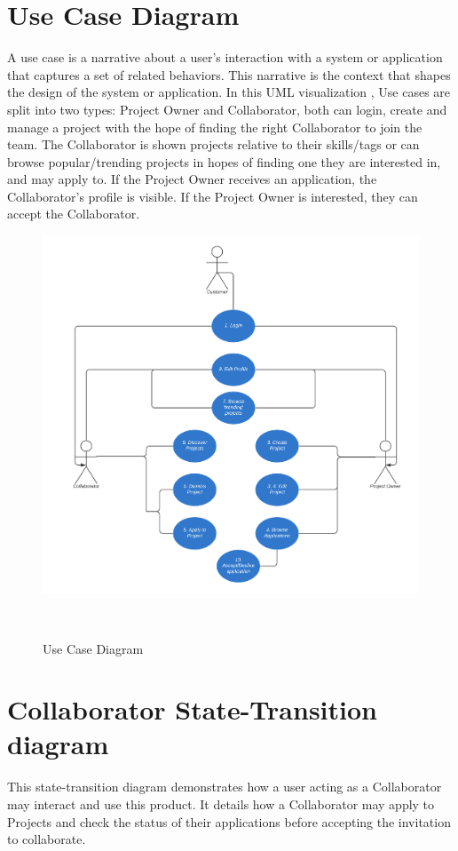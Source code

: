 \documentclass[a4paper,11pt]{report}
\begin{document}
\section{Use Case Diagram}
A use case is a narrative about a user's interaction with a system or
application that captures a set of related behaviors. This narrative is the
context that shapes the design of the system or application. In this UML
visualization , Use cases are split into two types: Project Owner and
Collaborator, both can login, create and manage a project with the hope of
finding the right Collaborator to join the team. The Collaborator is shown
projects relative to their skills/tags or can browse popular/trending projects
in hopes of finding one they are interested in, and may apply to. If the Project
Owner receives an application, the Collaborator’s profile is visible. If the
Project Owner is interested, they can accept the Collaborator.

\begin{figure}[H]
    \centering
    \includegraphics[width=\textwidth,height=\textheight,keepaspectratio]{usecasediagram.png}
    \caption{Use Case Diagram}
    \label{fig:usecase}
    \
\end{figure}

\newpage
\section{Collaborator State-Transition diagram}
This state-transition diagram demonstrates how a user acting as a Collaborator
may interact and use this product. It details how a Collaborator may apply to
Projects and check the status of their applications before accepting the
invitation to collaborate.
\end{document}
